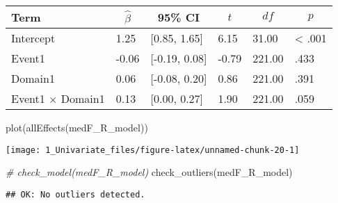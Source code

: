 \documentclass[
]{article}
\newenvironment{Shaded}{\begin{snugshade}}{\end{snugshade}}
\newcommand{\CommentTok}[1]{\textcolor[rgb]{0.56,0.35,0.01}{\textit{#1}}}
\newcommand{\FunctionTok}[1]{\textcolor[rgb]{0.00,0.00,0.00}{#1}}
\newcommand{\NormalTok}[1]{#1}
\newcommand{\SpecialCharTok}[1]{\textcolor[rgb]{0.00,0.00,0.00}{#1}}
\begin{document}
\begin{table}[tbp]

\begin{center}
\begin{threeparttable}

\caption{\label{tab:unnamed-chunk-20}}

\begin{tabular}{llllll}
\toprule
Term & \multicolumn{1}{c}{$\hat{\beta}$} & \multicolumn{1}{c}{95\% CI} & \multicolumn{1}{c}{$t$} & \multicolumn{1}{c}{$\mathit{df}$} & \multicolumn{1}{c}{$p$}\\
\midrule
Intercept & 1.25 & {}[0.85, 1.65] & 6.15 & 31.00 & < .001\\
Event1 & -0.06 & {}[-0.19, 0.08] & -0.79 & 221.00 & .433\\
Domain1 & 0.06 & {}[-0.08, 0.20] & 0.86 & 221.00 & .391\\
Event1 $\times$ Domain1 & 0.13 & {}[0.00, 0.27] & 1.90 & 221.00 & .059\\
\bottomrule
\end{tabular}

\end{threeparttable}
\end{center}

\end{table}

\begin{Shaded}
\begin{Highlighting}[]
\FunctionTok{plot}\NormalTok{(}\FunctionTok{allEffects}\NormalTok{(medF\_R\_model))}
\end{Highlighting}
\end{Shaded}

\texttt{[image: 1\_Univariate\_files/figure-latex/unnamed-chunk-20-1]}

\begin{Shaded}
\begin{Highlighting}[]
\CommentTok{\# check\_model(medF\_R\_model)}
\FunctionTok{check\_outliers}\NormalTok{(medF\_R\_model)}
\end{Highlighting}
\end{Shaded}

\begin{verbatim}
## OK: No outliers detected.
\end{verbatim}

\begin{Shaded}
\end{Shaded}
\end{document}
